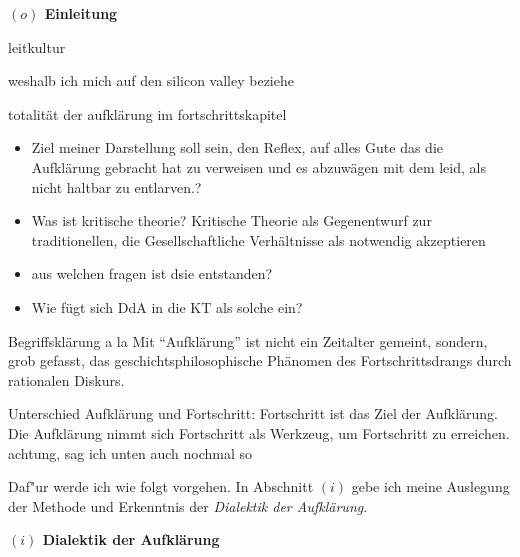 \documentclass[a4paper, 12pt]{article}
\begin{document}
\begin{onehalfspace} 

\noindent\textbf{$(o)$ Einleitung}

\noindent 


leitkultur

weshalb ich mich auf den silicon valley beziehe

totalität der aufklärung im fortschrittskapitel

\begin{itemize}

\item Ziel meiner Darstellung soll sein, den Reflex, auf alles Gute das die Aufklärung gebracht hat zu verweisen und es abzuwägen mit dem leid, als nicht haltbar zu entlarven.?
   \item Was ist kritische theorie? Kritische Theorie als Gegenentwurf zur traditionellen, die Gesellschaftliche Verhältnisse als notwendig akzeptieren
  \item aus welchen fragen ist dsie entstanden?
  \item Wie fügt sich DdA in die KT als solche ein?
\end{itemize}

Begriffsklärung a la Mit "`Aufklärung"' ist nicht ein Zeitalter gemeint, sondern, grob gefasst, das geschichtsphilosophische Phänomen des Fortschrittsdrangs durch rationalen Diskurs.

Unterschied Aufklärung und Fortschritt: Fortschritt ist das Ziel der Aufklärung. Die Aufklärung nimmt sich Fortschritt als Werkzeug, um Fortschritt zu erreichen. achtung, sag ich unten auch nochmal so


Daf"ur werde ich wie folgt vorgehen. In Abschnitt $(i)$ gebe ich meine Auslegung der Methode und Erkenntnis der \emph{Dialektik der Aufklärung}. 

\vspace{5mm}


\noindent\textbf{$(i)$ Dialektik der Aufklärung}


\end{onehalfspace}
\end{document}
